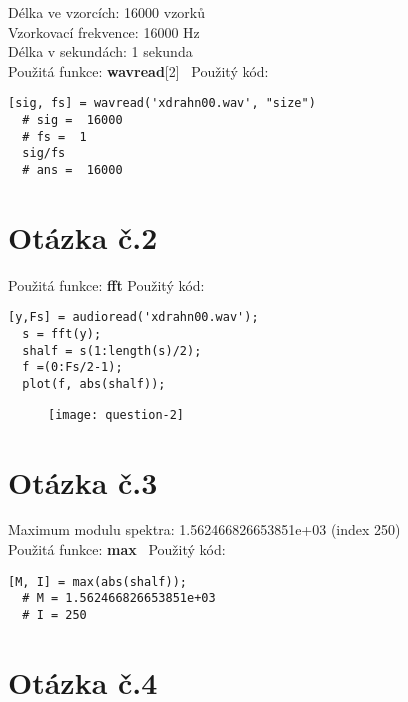 \documentclass[a4paper,11pt]{article}
\begin{document}
Délka ve vzorcích: 16000 vzorků\\
Vzorkovací frekvence: 16000 Hz\\
Délka v sekundách: 1 sekunda\\
\newline
Použitá funkce: \textbf{wavread}[2]\
\newline
\newline
Použitý kód:
\lstset{language=Octave}
\begin{lstlisting}[frame=single,breaklines]
  [sig, fs] = wavread('xdrahn00.wav', "size")
  # sig =  16000
  # fs =  1
  sig/fs
  # ans =  16000
\end{lstlisting}

\section{Otázka č.2}

Použitá funkce: \textbf{fft}
\newline
\newline
Použitý kód:
\lstset{language=Matlab}
\begin{lstlisting}[frame=single,breaklines]
  [y,Fs] = audioread('xdrahn00.wav');
  s = fft(y);
  shalf = s(1:length(s)/2);
  f =(0:Fs/2-1);
  plot(f, abs(shalf));
\end{lstlisting}

\begin{figure}[h]
  \centering
  \texttt{[image: question-2]}
\end{figure}

\section{Otázka č.3}

Maximum modulu spektra: 1.562466826653851e+03 (index 250)\\
\newline
Použitá funkce: \textbf{max}\
\newline
\newline
Použitý kód:
\lstset{language=Matlab}
\begin{lstlisting}[frame=single,breaklines]
  [M, I] = max(abs(shalf));
  # M = 1.562466826653851e+03
  # I = 250
\end{lstlisting}

\section{Otázka č.4}
\end{document}
